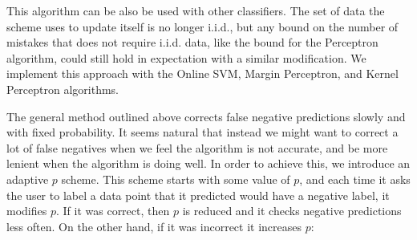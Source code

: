 \documentclass[12pt]{article}
\begin{document}
This algorithm can be also be used with other classifiers.  The set of data the scheme uses to update itself is no longer i.i.d., but any bound on the number of mistakes that does not require i.i.d. data, like the bound for the Perceptron algorithm, could still hold in expectation with a similar modification. We implement this approach with the Online SVM, Margin Perceptron, and Kernel Perceptron algorithms.

The general method outlined above corrects false negative predictions slowly and with fixed probability.  It seems natural that instead we might want to correct a lot of false negatives when we feel the algorithm is not accurate, and be more lenient when the algorithm is doing well.  In order to achieve this, we introduce an adaptive $p$ scheme.  This scheme starts with some value of $p$, and each time it asks the user to label a data point that it predicted would have a negative label, it modifies $p$.  If it was correct, then $p$ is reduced and it checks negative predictions less often.  On the other hand, if it was incorrect it increases $p$: \\
\end{document}
